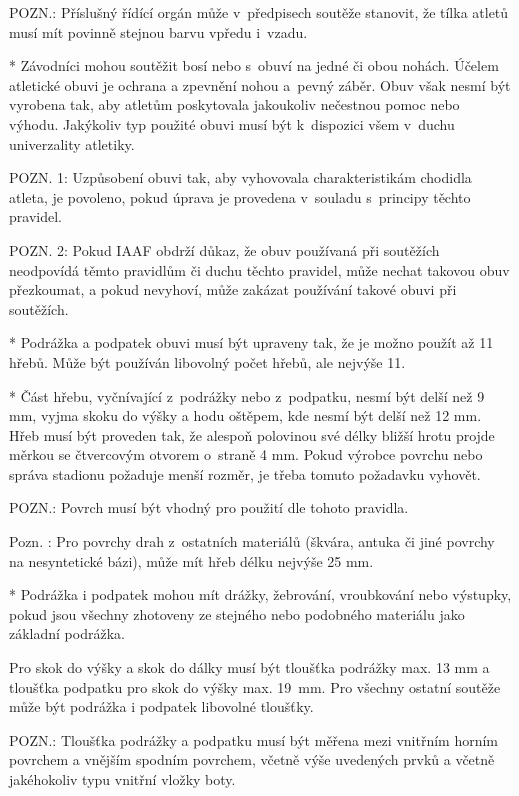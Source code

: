 POZN.: Příslušný řídící orgán může v~předpisech soutěže stanovit, že tílka atletů musí mít povinně stejnou barvu vpředu i~vzadu.

* Závodníci mohou soutěžit bosí nebo s~obuví na jedné či obou nohách. Účelem atletické obuvi je ochrana a zpevnění nohou a~pevný záběr. Obuv však nesmí být vyrobena tak, aby atletům poskytovala jakoukoliv nečestnou pomoc nebo výhodu. Jakýkoliv typ použité obuvi musí být k~dispozici všem v~duchu univerzality atletiky.

POZN. 1: Uzpůsobení obuvi tak, aby vyhovovala charakteristikám chodidla atleta, je povoleno, pokud úprava je provedena v~souladu s~principy těchto pravidel.

POZN. 2: Pokud IAAF obdrží důkaz, že obuv používaná při soutěžích neodpovídá těmto pravidlům či duchu těchto pravidel, může nechat takovou obuv přezkoumat, a pokud nevyhoví, může zakázat používání takové obuvi při soutěžích.

* Podrážka a podpatek obuvi musí být upraveny tak, že je možno použít až 11 hřebů. Může být používán libovolný počet hřebů, ale nejvýše 11.

* Část hřebu, vyčnívající z~podrážky nebo z~podpatku, nesmí být delší než 9 mm, vyjma skoku do výšky a hodu oštěpem, kde nesmí být delší než 12 mm. Hřeb musí být proveden tak, že alespoň polovinou své délky bližší hrotu projde měrkou se čtvercovým otvorem o~straně 4 mm. Pokud výrobce povrchu nebo správa stadionu požaduje menší rozměr, je třeba tomuto požadavku vyhovět.

POZN.: Povrch musí být vhodný pro použití dle tohoto pravidla.

Pozn. : Pro povrchy drah z~ostatních materiálů (škvára, antuka či jiné povrchy na nesyntetické bázi), může mít hřeb délku nejvýše 25 mm.

* Podrážka i podpatek mohou mít drážky, žebrování, vroubkování nebo výstupky, pokud jsou všechny zhotoveny ze stejného nebo podobného materiálu jako základní podrážka.

Pro skok do výšky a skok do dálky musí být tloušťka podrážky max. 13 mm a tloušťka podpatku pro skok do výšky max. 19~mm. Pro všechny ostatní soutěže může být podrážka i podpatek libovolné tloušťky.

POZN.: Tloušťka podrážky a podpatku musí být měřena mezi vnitřním horním povrchem a vnějším spodním povrchem, včetně výše uvedených prvků a včetně jakéhokoliv typu vnitřní vložky boty.

